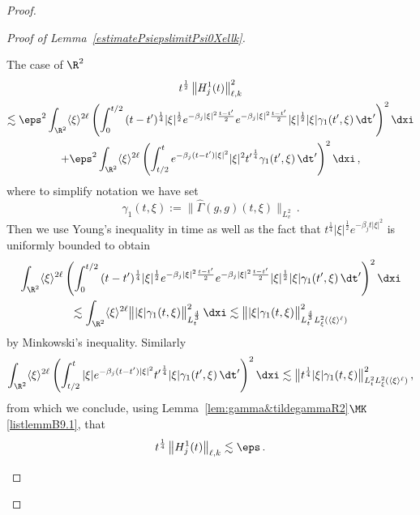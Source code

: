 \begin{proof}
\begin{proof}[{Proof of Lemma~\ref{estimatePsiepslimitPsi0Xellk}}]
\begin{step}{The case of $\R^2$}
\begin{multline*}
{t^\frac12}\left\|H^1_j(t) \right\|^2_{\ell,k} \\
\lesssim \eps^2 \int_{\R^2} \langle \xi \rangle^{2\ell} \left(\int_0^{t/2} {(t-{t'})^{\frac14} |\xi|^\frac12} e^{-\beta_j|\xi|^2 \frac{t-t'}{2}} e^{-\beta_j|\xi|^2 \frac{t-t'}{2}} {|\xi|^\frac12}|\xi| {\gamma_1}({t'},\xi) \, \dt' \right)^2 \dxi\\
+ \eps^2 \int_{\R^2} \langle \xi \rangle^{2 \ell}\left(\int_{t/2}^{t} e^{-\beta_j(t-{t'})|\xi|^2} |\xi|^2 {{t'}^\frac14} {\gamma_1}({t'},\xi) \, \dt' \right)^2 \dxi
\,,
\end{multline*}
where to simplify notation we have set
\[
\gamma_1(t,\xi):=\big\| \widehat {\Gamma}(g,g)({t},\xi)\big\|_{L^2_v}\,.
\]
Then we use Young's inequality in time as well as the fact that $t^{\frac14} |\xi| ^{\frac12} e^{- \beta_j t |\xi|^2}$ is uniformly bounded to obtain
\begin{multline*}
\int_{\R^2} \langle \xi \rangle^{2\ell} \left(\int_0^{t/2} {(t-{t'})^{\frac14} |\xi|^\frac12} e^{-\beta_j|\xi|^2 \frac{t-t'}{2}} e^{-\beta_j|\xi|^2 \frac{t-t'}{2}} {|\xi|^\frac12}|\xi| {\gamma_1}({t'},\xi) \, \dt'\right)^2 \dxi\\
\lesssim \int_{\R^2} \langle \xi \rangle^{2\ell} \big\| |\xi| {\gamma_1}(t, \xi)\big\|_{L^\frac43_t}^2 \, \dxi 
\lesssim { \big\| |\xi| \gamma_1(t,\xi) \big\|_{L^\frac43_t L^2_\xi(\langle \xi \rangle^\ell)}^2}
\end{multline*}
by Minkowski's inequality. Similarly
\[
\int_{\R^2} \langle \xi \rangle^{2 \ell}\left(\int_{t/2}^{t} |\xi| e^{-\beta_j(t-{t'})|\xi|^2} {{t'}^\frac14} |\xi| {\gamma_1}({t'},\xi) \, \dt' \right)^2 \dxi \lesssim { \big\|{t^{\frac14}} |\xi| \gamma_1(t,\xi)\big\|^2_{L^2_t L^2_\xi(\langle \xi \rangle^\ell)} }\,,
\]
from which we conclude, using Lemma~\ref{lem:gamma&tildegammaR2}$\MK$\eqref{listlemmB9.1}, that
\[
{t^{\frac14}} \left\|H^1_j(t)\right\|_{\ell,k} \lesssim\eps\,.
\]




\end{step}
\end{proof}
\end{proof}
